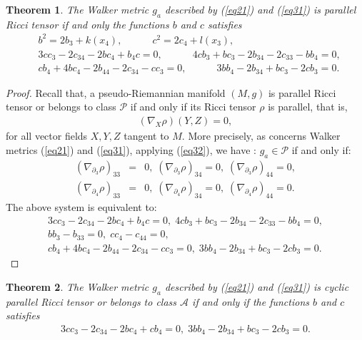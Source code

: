 \documentclass[reqno, 12pt]{amsart}
\numberwithin{equation}{section}
\newtheorem{theorem}{Theorem}[section]
\begin{document}
 \begin{theorem}
The Walker metric $g_a$ described by (\ref{eq21}) and (\ref{eq31})
is parallel Ricci tensor if and only the functions $b$ and $c$ satisfies
\begin{eqnarray*}
& b^2 = 2b_3+k(x_4),\quad \quad \quad 
c^2=2c_4+l(x_3), \\
& 3cc_3-2c_{34}-2bc_4+b_4c = 0, \quad \quad \quad  
4cb_3 + bc_{3} - 2b_{34} - 2c_{33} - bb_4 = 0, \\
& cb_4 + 4bc_4 - 2b_{44} - 2c_{34} - cc_3 = 0, \quad \quad \quad 
3bb_4 - 2b_{34} + bc_3 - 2cb_3 = 0.
\end{eqnarray*}
\end{theorem}

\begin{proof}
Recall that, a pseudo-Riemannian manifold $(M,g)$ is parallel Ricci tensor 
or belongs to class $\mathcal{P}$ if and only if its Ricci tensor $\rho$ is parallel, that is,
\begin{eqnarray}\label{eq32}
 (\nabla_X \rho)(Y,Z) = 0,
 \end{eqnarray}
for all vector fields $X,Y,Z$ tangent to $M$. More precisely, as concerns  Walker metrics (\ref{eq21}) and (\ref{eq31}), applying (\ref{eq32}), we 
have : $g_a\in \mathcal{P}$ if and only if:
 \begin{eqnarray*}
(\nabla_{\partial_3}\rho)_{33} &=& 0, \;
(\nabla_{\partial_3}\rho)_{34} = 0, \; 
(\nabla_{\partial_3}\rho)_{44} = 0 ,\\
(\nabla_{\partial_4}\rho)_{33} &=& 0, \; 
(\nabla_{\partial_4}\rho)_{34} = 0, \; 
(\nabla_{\partial_4}\rho)_{44} = 0.
 \end{eqnarray*}
The above system  is equivalent to:
\begin{eqnarray*}
3cc_3 - 2c_{34} - 2bc_4 + b_4c = 0, \;
4cb_3 + bc_{3} - 2b_{34} - 2c_{33} - bb_4 =0 , \\
bb_3 - b_{33} = 0,\; cc_4 - c_{44} = 0 , \\
cb_4 + 4bc_4 - 2b_{44} - 2c_{34} - cc_3 =0, \;
3bb_4 - 2b_{34} + bc_3 - 2cb_3 =0 .
\end{eqnarray*}
\end{proof}

\begin{theorem}
The Walker metric $g_a$ described by (\ref{eq21}) and (\ref{eq31}) is
cyclic parallel Ricci tensor or belongs to class $\mathcal{A}$ if and only 
if the functions $b$ and $c$ satisfies
\begin{eqnarray*}
3cc_3 - 2c_{34} - 2bc_4 + cb_4 = 0,\;
3bb_4 - 2b_{34} + bc_3 - 2cb_3=0.
\end{eqnarray*}
\end{theorem}
\end{document}
